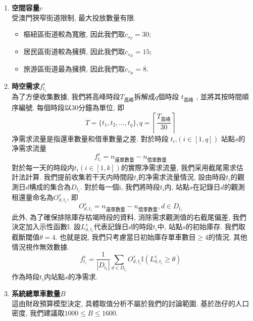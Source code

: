 \begin{enumerate}
    \item \textbf{空間容量\(c\)}\\
    受澳門狹窄街道限制, 最大投放數量有限. 
    \begin{itemize}
        \item 樞紐區街道較為寬敞, 因此我們取\(c_{s_T}=30\); 
	    \item 居民區街道較為擁擠, 因此我們取\(c_{s_R}=15\); 
	    \item 旅游區街道最為擁擠, 因此我們取\(c_{s_H}=8\).
    \end{itemize}
    \item \textbf{時空需求\(f_{t_i}^s\)}\\
    為了方便收集數據, 我們將高峰時段\(T_\text{高峰}\)拆解成\(q\)個時段 \(t_\text{高峰}\) , 並將其按時間順序編號. 每個時段以30分鐘為單位, 即
    \begin{equation}
        T= \{t_1, t_2, \dots, t_q\},q=\left\lceil{\frac{T_\text{高峰}}{30}}\right\rceil
    \end{equation}
    净需求流量是指還車數量和借車數量之差. 對於時段 \(t_i\),\((i∈[1,q])\) 站點\(s\)的净需求流量
    \begin{equation}
        f_{t_i}^s = n_\text{還車數量} - n_\text{借車數量}
    \end{equation}
    對於每一天的時段内\(t_i (i∈[1,k])\)的實際净需求流量, 我們采用截尾需求估計法計算. 我們提前收集若干天内時間段\(t_i\)的净需求流量情況, 設由時段\(t_i\)的觀測日\(d\)構成的集合為\(D_{t_i}\). 
    對於每一個i, 我們將時段\(t_i\)内, 站點\(s\)在記錄日\(d\)的觀測租還量命名為\(O_{d,t_i}^s\), 即
    \begin{equation}
        O_{d,t_i}^s = n_\text{還車數量} - n_\text{借車數量}, d\in D_{t_i}
    \end{equation}
    此外, 為了確保排除庫存枯竭時段的資料, 消除需求觀測值的右截尾偏差, 我們決定加入示性函數\(\mathbb{I}\). 設\(L_{d,t_i}^s\)代表記錄日\(d\)的時段\(t_i\)中, 站點\(s\)的初始庫存. 我們取截斷閾值\(\theta=4\). 也就是説, 我們只考慮當日初始庫存單車數目\(\geqslant4\)的情況, 其他情況視作無效數據. 
    \begin{equation}
        f_{t_i}^s = \frac{1}{|D_{t_i}|}\sum_{d\in D_{t_i}}O_{d,t_i}^s \mathbb{I}(L_{d,t_i}^s\geqslant\theta)
    \end{equation}
    作為時段\(t_i\)内站點\(s\)的净需求.
    \item \textbf{系統總單車數量\(B\)}\\
    這由財政預算模型決定, 具體取值分析不屬於我們的討論範圍. 基於氹仔的人口密度, 我們建議取\(1000\leqslant B \leqslant 1600\). 

\end{enumerate}

